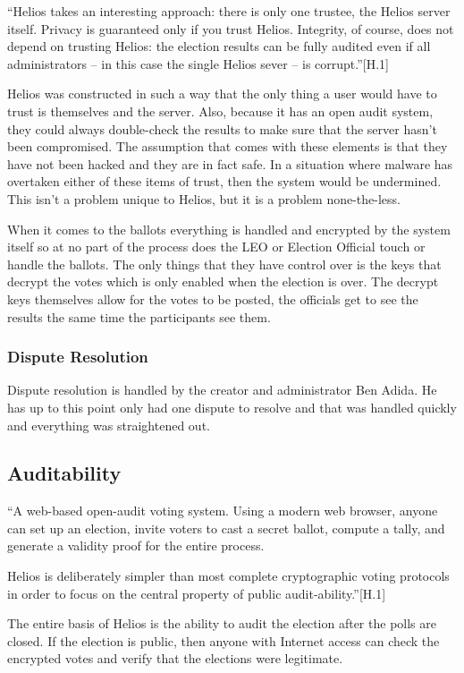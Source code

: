 ``Helios takes an interesting approach: there is only one trustee, the Helios server itself. Privacy is guaranteed only if you trust Helios. Integrity, of course, does not depend on trusting Helios: the election results can be fully audited even if all administrators -- in this case the single Helios sever -- is corrupt.''[H.1]

Helios was constructed in such a way that the only thing a user would have to trust is themselves and the server. Also, because it has an open audit system, they could always double-check the results to make sure that the server hasn't been compromised. The assumption that comes with these elements is that they have not been hacked and they are in fact safe. In a situation where malware has overtaken either of these items of trust, then the system would be undermined. This isn't a problem unique to Helios, but it is a problem none-the-less.

When it comes to the ballots everything is handled and encrypted by the system itself so at no part of the process does the LEO or Election Official touch or handle the ballots. The only things that they have control over is the keys that decrypt the votes which is only enabled when the election is over. The decrypt keys themselves allow for the votes to be posted, the officials get to see the results the same time the participants see them.

\subsubsection{Dispute Resolution}

Dispute resolution is handled by the creator and administrator Ben Adida. He has up to this point only had one dispute to resolve and that was handled quickly and everything was straightened out.

\subsection{Auditability}

``A web-based open-audit voting system. Using a modern web browser, anyone can set up an election, invite voters to cast a secret ballot, compute a tally, and generate a validity proof for the entire process.

Helios is deliberately simpler than most complete cryptographic voting protocols in order to focus on the central property of public audit-ability.''[H.1]

The entire basis of Helios is the ability to audit the election after the polls are closed. If the election is public, then anyone with Internet access can check the encrypted votes and verify that the elections were legitimate.


